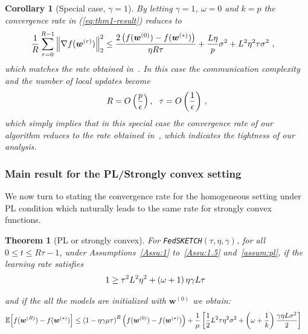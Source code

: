 \documentclass[sigconf, anonymous, review]{acmart}
\newtheorem{theorem}{Theorem}
\newtheorem{corollary}{Corollary}
\begin{document}
\begin{corollary}[Special case, $\gamma=1$]
By letting $\gamma=1$, $\omega=0$ and $k=p$ the convergence rate in (\ref{eq:thm1-result}) reduces to 
\begin{align}\notag
     \frac{1}{R}\sum_{r=0}^{R-1}\left\|\nabla f({\boldsymbol{w}}^{(r)})\right\|_2^2&\leq \frac{2\left(f(\boldsymbol{w}^{(0)})-f(\boldsymbol{w}^{(*)})\right)}{\eta R\tau}+\frac{L\eta }{p}\sigma^2+{L^2\eta^2\tau }\sigma^2 \ ,
\end{align}
which matches the rate  obtained in~\citep{wang2018cooperative}. In this case the communication complexity and the number of local updates become 
\begin{align}\notag
    {R}=O\left(\frac{p}{\epsilon}\right), \:\:\: \tau=O\left(\frac{1}{\epsilon}\right) \, ,
\end{align}
which simply implies  that in this special case the convergence rate of our algorithm reduces to the  rate obtained in~\citep{wang2018cooperative}, which indicates the tightness of  our analysis.
\end{corollary}



\subsubsection{Main result for the PL/Strongly convex setting}
 
We now turn to stating the convergence rate for the homogeneous setting under PL condition which naturally leads to the same rate for strongly convex functions.
\begin{theorem}[PL or strongly convex]\label{thm:pl-iid}
For \texttt{FedSKETCH}$(\tau, \eta, \gamma)$, for all $0\leq t\leq R\tau-1$,  under Assumptions~\ref{Assu:1} to~\ref{Assu:1.5} and~\ref{assum:pl}, if the learning rate satisfies 
\begin{align}\notag
   1\geq {\tau^2 L^2\eta^2}+\left(\omega+1\right){\eta\gamma L}{\tau}  \
\end{align}

and if the all the models are initialized with $\boldsymbol{w}^{(0)}$ we obtain:
\begin{align}\notag
        \mathbb{E}\Big[f({\boldsymbol{w}}^{(R)})-f({\boldsymbol{w}}^{(*)})\Big]&\leq \left(1-\eta\gamma{\mu\tau}\right)^R\left(f(\boldsymbol{w}^{(0)})-f(\boldsymbol{w}^{(*)})\right)+\frac{1}{{\mu}}\left[\frac{1}{2} L^2\tau\eta^2\sigma^2+\left(\omega+\frac{1}{k}\right)\frac{\gamma\eta L\sigma^2}{2}\right]
\end{align}
\end{theorem}
\end{document}
